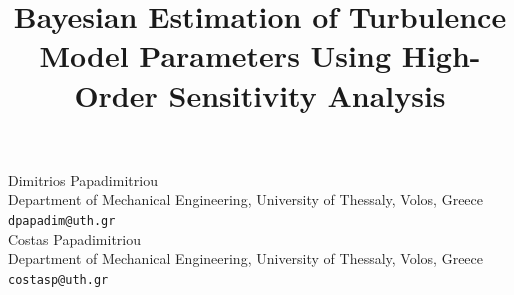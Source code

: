 \documentclass[article,A4,11pt]{llncs}%
\begin{document}
\title{Bayesian Estimation of Turbulence Model Parameters Using High-Order Sensitivity Analysis}
 \author{} \institute{}
\maketitle
\begin{center}
{\large Dimitrios Papadimitriou}\\
Department of Mechanical Engineering, University of Thessaly, Volos, Greece\\
{\tt dpapadim@uth.gr}
\\ \vspace{4mm}
{\large Costas Papadimitriou}\\
Department of Mechanical Engineering, University of Thessaly, Volos, Greece\\
{\tt costasp@uth.gr}
\end{center}
\end{document}
